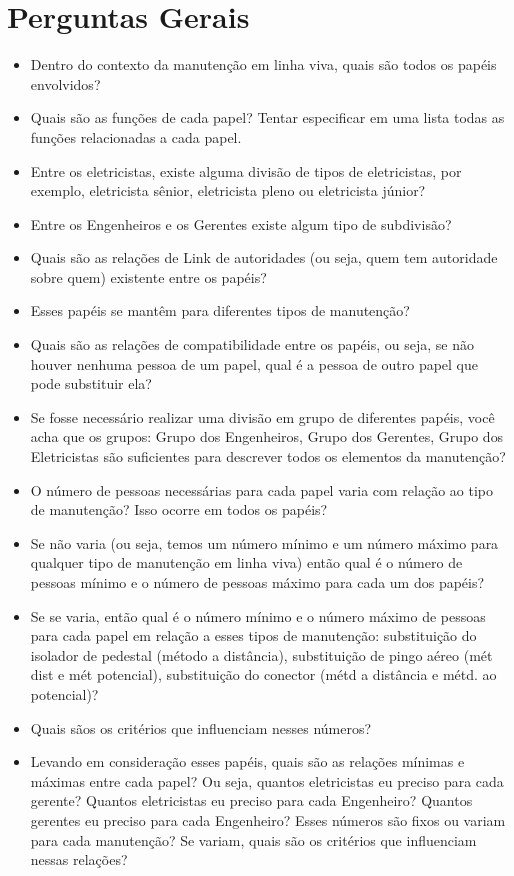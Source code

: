 \section{Perguntas Gerais}
\begin{itemize}
\item Dentro do contexto da manutenção em linha viva, quais são todos os papéis envolvidos?
\item Quais são as funções de cada papel? Tentar especificar em uma lista todas as funções relacionadas a cada papel.
\item Entre os eletricistas, existe alguma divisão de tipos de eletricistas, por exemplo, eletricista sênior, eletricista pleno ou eletricista júnior?
\item Entre os Engenheiros e os Gerentes existe algum tipo de subdivisão?
\item Quais são as relações de Link de autoridades (ou seja, quem tem autoridade sobre quem) existente entre os papéis?
\item Esses papéis se mantêm para diferentes tipos de manutenção?
\item Quais são as relações de compatibilidade entre os papéis, ou seja, se não houver nenhuma pessoa de um papel, qual é a pessoa de outro papel que pode substituir ela?
\item Se fosse necessário realizar uma divisão em grupo de diferentes papéis, você acha que os grupos: Grupo dos Engenheiros, Grupo dos Gerentes, Grupo dos Eletricistas são suficientes para descrever todos os elementos da manutenção?
\item O número de pessoas necessárias para cada papel varia com relação ao tipo de manutenção? Isso ocorre em todos os papéis?
\item Se não varia (ou seja, temos um número mínimo e um número máximo para qualquer tipo de manutenção em linha viva) então qual é o número de pessoas mínimo e o número de pessoas máximo para cada um dos papéis?
\item Se se varia, então qual é o número mínimo e o número máximo de pessoas para cada papel em relação a esses tipos de manutenção: substituição do isolador de pedestal (método a distância), substituição de pingo aéreo (mét dist e mét potencial), substituição do conector (métd a distância e métd. ao potencial)?
\item Quais sãos os critérios que influenciam nesses números?
\item Levando em consideração esses papéis, quais são as relações mínimas e máximas entre cada papel? Ou seja, quantos eletricistas eu preciso para cada gerente? Quantos eletricistas eu preciso para cada Engenheiro? Quantos gerentes eu preciso para cada Engenheiro? Esses números são fixos ou variam para cada manutenção? Se variam, quais são os critérios que influenciam nessas relações?

\end{itemize}
